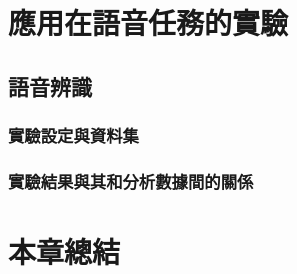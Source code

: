 
\section{應用在語音任務的實驗}

\subsection{語音辨識}

\subsubsection{實驗設定與資料集}

\subsubsection{實驗結果與其和分析數據間的關係}



\section{本章總結}
